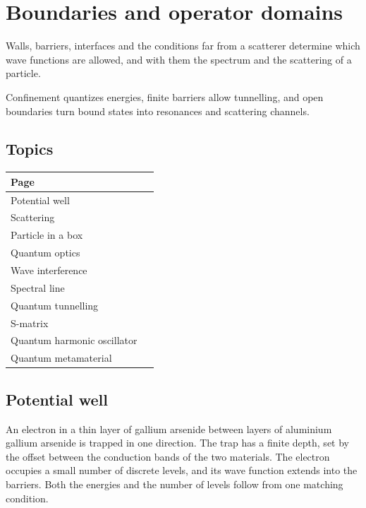 \documentclass[11pt,oneside]{book}
\begin{document}
\chapter{Boundaries and operator domains}

Walls, barriers, interfaces and the conditions far from a scatterer determine which wave functions are allowed, and with them the spectrum and the scattering of a particle.

Confinement quantizes energies, finite barriers allow tunnelling, and open boundaries turn bound states into resonances and scattering channels.

\section*{Topics}

\begin{longtable}{p{0.92\linewidth}}
\toprule
Page \\
\midrule
\endhead
{}\label{page:potential-well}Potential well \\
\label{page:scattering}Scattering \\
\label{page:particle-in-a-box}Particle in a box \\
\label{page:quantum-optics}Quantum optics \\
\label{page:wave-interference}Wave interference \\
\label{page:spectral-line}Spectral line \\
\label{page:quantum-tunnelling}Quantum tunnelling \\
\label{page:s-matrix}S-matrix \\
\label{page:quantum-harmonic-oscillator}Quantum harmonic oscillator \\
\label{page:quantum-metamaterial}Quantum metamaterial \\
\bottomrule
\end{longtable}

\clearpage

\section{Potential well}

\label{topic:potential-well}

An electron in a thin layer of gallium arsenide between layers of aluminium gallium arsenide is trapped in one direction. The trap has a finite depth, set by the offset between the conduction bands of the two materials. The electron occupies a small number of discrete levels, and its wave function extends into the barriers. Both the energies and the number of levels follow from one matching condition.
\end{document}
